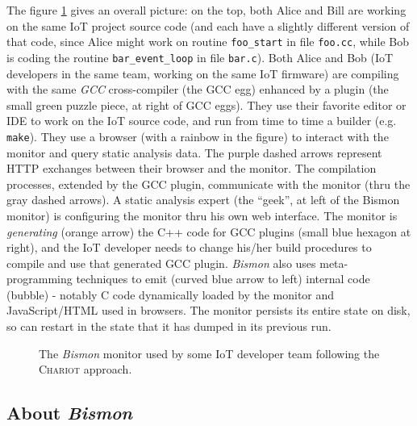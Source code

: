 The figure \ref{fig:bismonit} gives an overall picture: on the top,
both Alice and Bill are working on the same IoT project source code
(and each have a slightly different version of that code, since Alice
might work on routine \texttt{foo\_start} in file \texttt{foo.cc},
while Bob is coding the routine \texttt{bar\_event\_loop} in file
\texttt{bar.c}). Both Alice and Bob (IoT developers in the same team,
working on the same IoT firmware) are compiling with the same
\emph{GCC} cross-compiler (the GCC egg) enhanced by a plugin (the
small green puzzle piece, at right of GCC eggs). They use their
favorite editor or IDE to work on the IoT source code, and run from
time to time a builder (e.g. \texttt{make}). They use a browser (with
a rainbow in the figure) to interact with the monitor and query static
analysis data. The purple dashed arrows represent HTTP exchanges
between their browser and the monitor. The compilation processes,
extended by the GCC plugin, communicate with the monitor (thru the
gray dashed arrows). A static analysis expert (the ``geek'', at left
of the Bismon monitor) is configuring the monitor thru his own web
interface. The monitor is \emph{generating} (orange arrow) the C++
code for GCC plugins (small blue hexagon at right), and the IoT
developer needs to change his/her build procedures to compile and use
that generated GCC plugin. \emph{Bismon} also uses meta-programming
techniques to emit (curved blue arrow to left) internal code (bubble)
- notably C code dynamically loaded by the monitor and JavaScript/HTML
used in browsers. The monitor persists its entire state on disk, so
can restart in the state that it has dumped in its previous run.

\begin{figure}
  \begin{center}
  \end{center}
  \caption{The \emph{Bismon} monitor used by some IoT developer team following the \textsc{Chariot} approach.}
  \label{fig:bismonit}
\end{figure}

\newpage 
\subsection{About \textit{Bismon}}

